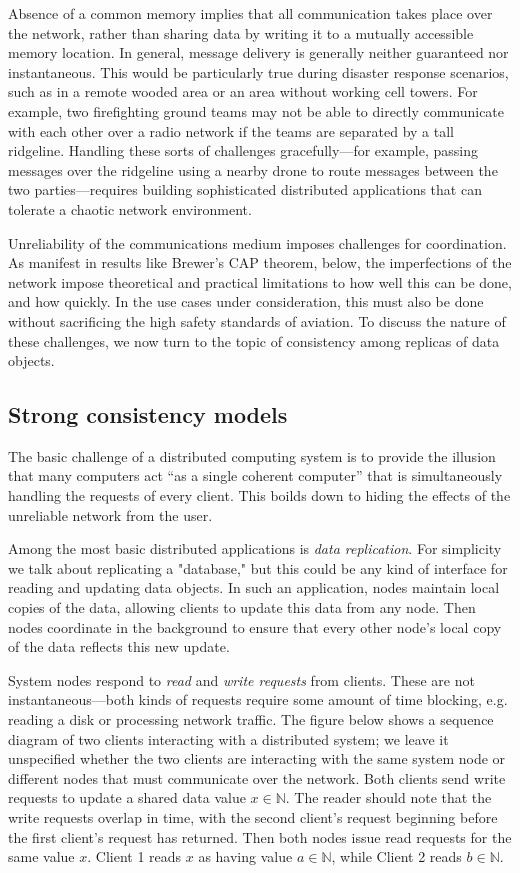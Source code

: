 Absence of a common memory implies that all communication takes place
over the network, rather than sharing data by writing it to a mutually
accessible memory location. In general, message delivery is generally
neither guaranteed nor instantaneous. This would be particularly true
during disaster response scenarios, such as in a remote wooded area or
an area without working cell towers. For example, two firefighting
ground teams may not be able to directly communicate with each other
over a radio network if the teams are separated by a tall
ridgeline. Handling these sorts of challenges gracefully---for
example, passing messages over the ridgeline using a nearby drone to
route messages between the two parties---requires building
sophisticated distributed applications that can tolerate a chaotic
network environment.

Unreliability of the communications medium imposes challenges for
coordination. As manifest in results like Brewer's CAP theorem, below,
the imperfections of the network impose theoretical and practical
limitations to how well this can be done, and how quickly. In the use
cases under consideration, this must also be done without sacrificing
the high safety standards of aviation. To discuss the nature of these
challenges, we now turn to the topic of consistency among replicas
of data objects.

\subsection{Strong consistency models}

The basic challenge of a distributed computing system is to provide
the illusion that many computers act ``as a single coherent computer''
\cite{TanenbaumSteen07} that is simultaneously handling the requests
of every client. This boilds down to hiding the effects of the
unreliable network from the user.

Among the most basic distributed applications is \emph{data
replication}.  For simplicity we talk about replicating a "database,"
but this could be any kind of interface for reading and updating data
objects. In such an application, nodes maintain local copies of the
data, allowing clients to update this data from any node. Then nodes
coordinate in the background to ensure that every other node's local
copy of the data reflects this new update.

System nodes respond to \emph{read} and \emph{write requests} from
clients. These are not instantaneous---both kinds of requests require
some amount of time blocking, e.g. reading a disk or processing
network traffic. The figure below shows a sequence diagram of two
clients interacting with a distributed system; we leave it unspecified
whether the two clients are interacting with the same system node or
different nodes that must communicate over the network. Both clients
send write requests to update a shared data value $x \in \mathbb{N}$.
The reader should note that the write requests overlap in time, with
the second client's request beginning before the first client's
request has returned. Then both nodes issue read requests for the same
value $x$. Client 1 reads $x$ as having value $a \in \mathbb{N}$,
while Client 2 reads $b \in \mathbb{N}$.

